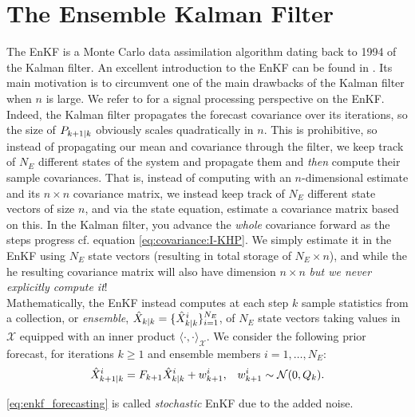\section{The Ensemble Kalman Filter}

The EnKF is a Monte Carlo data assimilation \cite{reich2015probabilistic} algorithm dating back to 1994 \cite{evensen1994sequential} of the Kalman filter. An excellent introduction to the EnKF can be found in \cite{katzfuss2016understanding}. Its main motivation is to circumvent one of
the main drawbacks of the Kalman filter when $n$ is large. We refer to \cite{roth2017ensemble} for a signal processing perspective on the EnKF. Indeed, the Kalman filter propagates the
forecast covariance over its iterations, so the size of $P_{k+1|k}$ obviously scales quadratically in
$n$. This is prohibitive, so instead of propagating our mean and covariance through the filter, we 
keep track of $N_E$ different states of the system and propagate them and \emph{then} compute their 
sample covariances. That is, instead
of computing with an $n$-dimensional estimate and its $n\times n$ covariance matrix, we instead
keep track of $N_E$ different state vectors of size $n$, and via the state equation, estimate a 
covariance matrix based on this. In the Kalman filter, you advance the \emph{whole} covariance
forward as the steps progress cf. equation \eqref{eq:covariance:I-KHP}. We simply estimate it in the
EnKF using $N_E$ state vectors (resulting in total storage of $N_E \times n$), and while the he 
resulting  covariance matrix will also have dimension $n\times n$ \emph{but we never explicitly
compute it}!\\

Mathematically, the EnKF instead computes at each step $k$ sample statistics from a collection, or
\emph{ensemble}, $\hat{X}_{k|k} = \{\hat{X}_{k|k}^i\}_{i=1}^{N_E}$, of $N_E$ state vectors taking values in
$\mathcal{X}$ equipped with an inner product $\langle\cdot, \cdot\rangle_\mathcal{X}$.
We consider the following prior forecast, for iterations $k\geq 1$ and ensemble members
$i=1,\ldots,N_E$:
\begin{align}\label{eq:enkf_forecasting}
& \hat{X}_{k+1|k}^i = F_{k+1} \hat{X}_{k|k}^i  + w_{k+1}^i, & w_{k+1}^i\sim \mathcal{N}(0, Q_k).
\end{align}

\begin{remark}
\eqref{eq:enkf_forecasting} is called \emph{stochastic} EnKF due to the added noise.\\
\end{remark}

